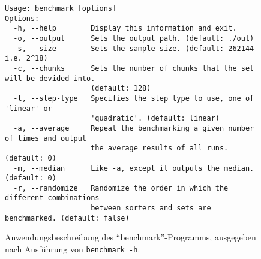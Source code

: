 \begin{figure}[hbp]
    \begin{lstlisting}[language=none, numbers=none]
Usage: benchmark [options]
Options:
  -h, --help        Display this information and exit.
  -o, --output      Sets the output path. (default: ./out)
  -s, --size        Sets the sample size. (default: 262144 i.e. 2^18)
  -c, --chunks      Sets the number of chunks that the set will be devided into.
                    (default: 128)
  -t, --step-type   Specifies the step type to use, one of 'linear' or
                    'quadratic'. (default: linear)
  -a, --average     Repeat the benchmarking a given number of times and output
                    the average results of all runs. (default: 0)
  -m, --median      Like -a, except it outputs the median. (default: 0)
  -r, --randomize   Randomize the order in which the different combinations
                    between sorters and sets are benchmarked. (default: false)
    \end{lstlisting}
    \caption{Anwendungsbeschreibung des \enquote{benchmark}-Programms, ausgegeben nach Ausführung von \lstinline{benchmark -h}.}
    \label{fig:benchmark-usage}
\end{figure}





